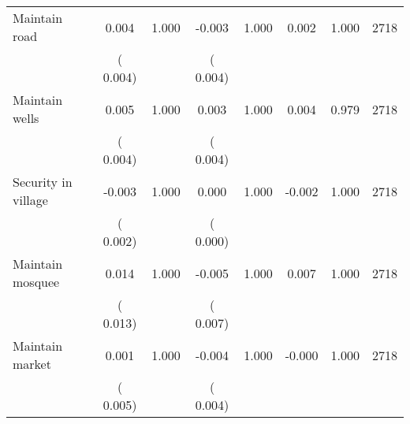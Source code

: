 \begin{tabular}{l*{7}{c}}
 Maintain road       &              0.004       &        1.000  &             -0.003       &        1.000  &              0.002       &              1.000 &  2718 \\ 
                       &       (       0.004)             &                               &       (       0.004)                     &                               &                                               &                                &                      \\ 

 Maintain wells       &              0.005       &        1.000  &              0.003       &        1.000  &              0.004       &              0.979 &  2718 \\ 
                       &       (       0.004)             &                               &       (       0.004)                     &                               &                                               &                                &                      \\ 

 Security in village       &             -0.003       &        1.000  &              0.000       &        1.000  &             -0.002       &              1.000 &  2718 \\ 
                       &       (       0.002)             &                               &       (       0.000)                     &                               &                                               &                                &                      \\ 

 Maintain mosquee       &              0.014       &        1.000  &             -0.005       &        1.000  &              0.007       &              1.000 &  2718 \\ 
                       &       (       0.013)             &                               &       (       0.007)                     &                               &                                               &                                &                      \\ 

 Maintain market       &              0.001       &        1.000  &             -0.004       &        1.000  &             -0.000       &              1.000 &  2718 \\ 
                       &       (       0.005)             &                               &       (       0.004)                     &                               &                                               &                                &                      \\ 

\hline \end{tabular}